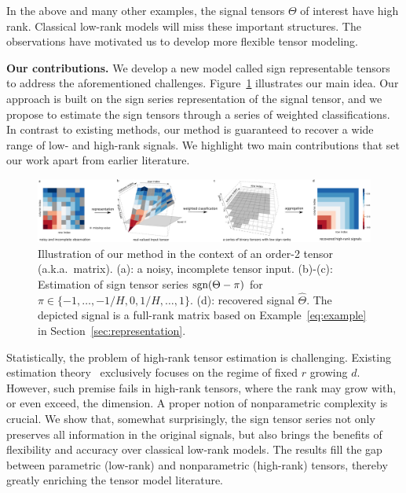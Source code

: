\documentclass{article}
\theoremstyle{plain}
\theoremstyle{definition}
\def\sign{\textup{sgn}}
\begin{document}
In the above and many other examples, the signal tensors $\Theta$ of interest have high rank. Classical low-rank models will miss these important structures. The observations have motivated us to develop more flexible tensor modeling. 


{\bf Our contributions.} We develop a new model called sign representable tensors to address the aforementioned challenges. 
Figure~\ref{fig:demo} illustrates our main idea. Our approach is built on the sign series representation of the signal tensor, and we propose to estimate the sign tensors through a series of weighted classifications. In contrast to existing methods, our method is guaranteed to recover a wide range of low- and high-rank signals. We highlight two main contributions that set our work apart from earlier literature. 

\begin{figure}[h!]
\captionsetup{font=footnotesize}
\centerline{\includegraphics[width=1.05\textwidth]{figure/demo.pdf}}
\caption{Illustration of our method in the context of an order-2 tensor (a.k.a.\ matrix). (a): a noisy, incomplete tensor input. (b)-(c): Estimation of sign tensor series $\sign(\Theta-\pi)$ for $\pi\in  \{-1,\ldots,-{1/ H},0,{1/H},\ldots,1\}$. (d): recovered signal $\hat \Theta$. The depicted signal is a full-rank matrix based on Example~\ref{eq:example} in Section~\ref{sec:representation}.}\label{fig:demo}
\vspace{-.2cm}
\end{figure}

Statistically, the problem of high-rank tensor estimation is challenging. Existing estimation theory~\citep{anandkumar2014tensor,montanari2018spectral,cai2019nonconvex} exclusively focuses on the regime of fixed $r$ growing $d$. However, such premise fails in high-rank tensors, where the rank may grow with, or even exceed, the dimension. A proper notion of nonparametric complexity is crucial. We show that, somewhat surprisingly, the sign tensor series not only preserves all information in the original signals, but also brings the benefits of flexibility and accuracy over classical low-rank models. The results fill the gap between parametric (low-rank) and nonparametric (high-rank) tensors, thereby greatly enriching the tensor model literature. 
\end{document}
